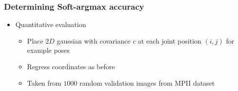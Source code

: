 \documentclass[9pt]{beamer}
\newenvironment{myframe}[1][]{%
\begin{frame}%
\frametitle{#1}
\setcounter{footnote}{0}


}{%
\end{frame}%
}
\begin{document}
\begin{myframe}[Determining Soft-argmax accuracy]
    \begin{itemize}
        \item Quantitative evaluation
        \begin{itemize}
            \item Place $2D$ gaussian with covariance $c$ at each joint position $(i,j)$ for example poses
            \item Regress coordinates as before
            \item Taken from $1000$ random validation images from MPII dataset
        \end{itemize}
    \end{itemize}
    \begin{table}[]
        \centering
    \end{table}    
\end{myframe}
\end{document}
